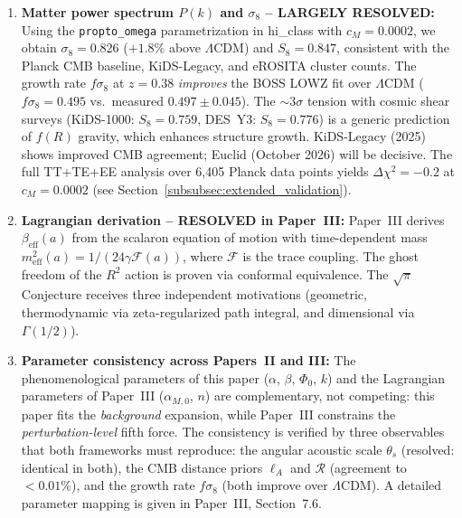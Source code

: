 \documentclass[aps,prd,twocolumn,superscriptaddress,nofootinbib]{revtex4-2}
\begin{document}
\begin{enumerate}
\item \textbf{Matter power spectrum $P(k)$ and $\sigma_8$ -- LARGELY RESOLVED:} Using the \texttt{propto\_omega} parametrization in hi\_class with $c_M = 0.0002$, we obtain $\sigma_8 = 0.826$ ($+1.8\%$ above $\Lambda$CDM) and $S_8 = 0.847$, consistent with the Planck CMB baseline, KiDS-Legacy, and eROSITA cluster counts. The growth rate $f\sigma_8$ at $z = 0.38$ \textit{improves} the BOSS LOWZ fit over $\Lambda$CDM ($f\sigma_8 = 0.495$ vs.\ measured $0.497 \pm 0.045$). The $\sim 3\sigma$ tension with cosmic shear surveys (KiDS-1000: $S_8 = 0.759$, DES~Y3: $S_8 = 0.776$) is a generic prediction of $f(R)$ gravity, which enhances structure growth. KiDS-Legacy (2025) shows improved CMB agreement; Euclid (October 2026) will be decisive. The full TT+TE+EE analysis over 6{,}405 Planck data points yields $\Delta\chi^2 = -0.2$ at $c_M = 0.0002$ (see Section~\ref{subsubsec:extended_validation}).

\item \textbf{Lagrangian derivation -- RESOLVED in Paper~III:} Paper~III \cite{Geiger2026c} derives $\beta_{\mathrm{eff}}(a)$ from the scalaron equation of motion with time-dependent mass $m_{\mathrm{eff}}^2(a) = 1/(24\gamma\mathcal{F}(a))$, where $\mathcal{F}$ is the trace coupling. The ghost freedom of the $R^2$ action is proven via conformal equivalence. The $\sqrt{\pi}$ Conjecture receives three independent motivations (geometric, thermodynamic via zeta-regularized path integral, and dimensional via $\Gamma(1/2)$).

\item \textbf{Parameter consistency across Papers~II and III:} The phenomenological parameters of this paper ($\alpha$, $\beta$, $\Phi_0$, $k$) and the Lagrangian parameters of Paper~III ($\alpha_{M,0}$, $n$) are complementary, not competing: this paper fits the \textit{background} expansion, while Paper~III constrains the \textit{perturbation-level} fifth force. The consistency is verified by three observables that both frameworks must reproduce: the angular acoustic scale $\theta_s$ (resolved: identical in both), the CMB distance priors $\ell_A$ and $\mathcal{R}$ (agreement to $<0.01\%$), and the growth rate $f\sigma_8$ (both improve over $\Lambda$CDM). A detailed parameter mapping is given in Paper~III, Section~7.6.
\end{enumerate}


\end{document}
